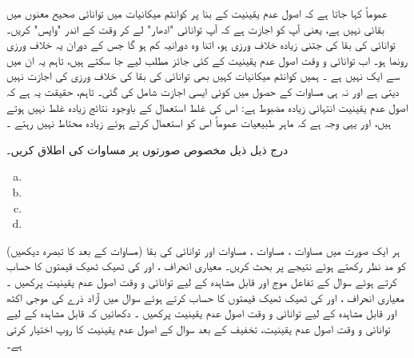 عموماً کہا جاتا ہے کہ اصول عدم یقینیت کے بنا پر کوانٹم میکانیات میں توانائی صحیح معنوں میں بقائی نہیں ہے، یعنی آپ کو اجازت ہے کہ آپ توانائی  "ادھار" لے کر وقت  کے اندر "واپس" کریں۔ توانائی کی بقا کی جتنی زیادہ خلاف ورزی ہو، اتنا وہ دورانیہ کم ہو گا جس کے دوران یہ خلاف ورزی رونما ہو۔ اب توانائی و وقت اصول عدم یقینیت کے کئی جائز مطلب لیے جا سکتے ہیں، تاہم یہ ان میں سے ایک نہیں ہے ۔ ہمیں کوانٹم میکانیات کہیں بھی توانائی کی بقا کی خلاف ورزی کی اجازت نہیں دیتی ہے اور نہ ہی
 مساوات  کے حصول میں کوئی ایسی اجازت شامل کی گئی۔ تاہم، حقیقت یہ ہے کہ اصول عدم یقینیت انتہائی زیادہ مضبوط ہے: اس کی غلط استعمال کے باوجود نتائج زیادہ غلط نہیں ہوتے ہیں، اور یہی وجہ ہے کہ ماہر طبیعیات عموماً اس کو استعمال کرتے ہوئے زیادہ محتاط نہیں رہتے ۔
 
درج ذیل ذیل مخصوص صورتوں پر مساوات  کی اطلاق کریں۔
\begin{multicols}{4}
\begin{enumerate}[a.]
\item {}
\item {}
\item {}
\item {}
\end{enumerate}
\end{multicols}
 ہر ایک صورت میں مساوات ، مساوات ، مساوات  اور توانائی کی بقا (مساوات  کے بعد کا تبصرہ دیکھیں) کو مد نظر رکھتے ہوئے نتیجے پر بحث کریں۔
معیاری انحراف ،  اور  کی ٹھیک ٹھیک قیمتوں کا حساب کرتے ہوئے سوال  کے تفاعل موج اور قابل مشاہدہ  کے لیے توانائی و وقت اصول عدم یقینیت پرکھیں ۔
معیاری انحراف ،  اور  کی ٹھیک ٹھیک قیمتوں کا حساب کرتے ہوئے سوال  میں آزاد ذرے کی موجی اکٹھ اور قابل مشاہدہ  کے لیے توانائی و وقت اصول عدم یقینیت پرکھیں ۔
دکھائیں کہ قابل مشاہدہ  کے لیے توانائی و وقت اصول عدم یقینیت، تخفیف کے بعد سوال  کے اصول عدم یقینیت کا روپ اختیار کرتی ہے۔

